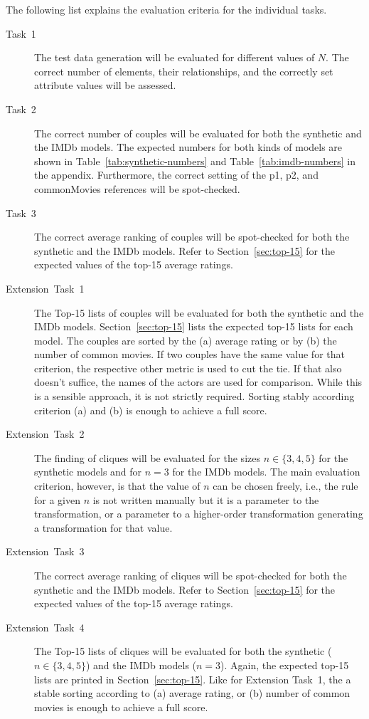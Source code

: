 \documentclass[a4paper,11pt]{article}
\newcommand{\p}[1]{\textsf{\small #1}}
\begin{document}
The following list explains the evaluation criteria for the individual tasks.

\begin{description}
\item[Task~1] The test data generation will be evaluated for different values
  of \(N\).
  The correct number of elements, their relationships, and the correctly set
  attribute values will be assessed.
\item[Task~2] The correct number of couples will be evaluated for both the
  synthetic and the IMDb models.  The expected numbers for both kinds of models
  are shown in Table~\ref{tab:synthetic-numbers} and
  Table~\ref{tab:imdb-numbers} in the appendix.  Furthermore, the correct
  setting of the \p{p1}, \p{p2}, and \p{commonMovies} references will be
  spot-checked.
\item[Task~3] The correct average ranking of couples will be spot-checked for
  both the synthetic and the IMDb models.  Refer to Section~\ref{sec:top-15}
  for the expected values of the top-15 average ratings.
\item[Extension~Task~1] The Top-15 lists of couples will be evaluated for both
  the synthetic and the IMDb models.  Section~\ref{sec:top-15} lists the
  expected top-15 lists for each model.  The couples are sorted by the (a)
  average rating or by (b) the number of common movies.  If two couples have
  the same value for that criterion, the respective other metric is used to cut
  the tie.  If that also doesn't suffice, the names of the actors are used for
  comparison.  While this is a sensible approach, it is not strictly required.
  Sorting stably according criterion (a) and (b) is enough to achieve a full
  score.
\item[Extension~Task~2] The finding of cliques will be evaluated for the sizes
  \(n \in \{3,4,5\}\) for the synthetic models and for \(n=3\) for the IMDb
  models.  The main evaluation criterion, however, is that the value of \(n\)
  can be chosen freely, i.e., the rule for a given \(n\) is not written
  manually but it is a parameter to the transformation, or a parameter to a
  higher-order transformation generating a transformation for that value.
\item[Extension~Task~3] The correct average ranking of cliques will be
  spot-checked for both the synthetic and the IMDb models.  Refer to
  Section~\ref{sec:top-15} for the expected values of the top-15 average
  ratings.
\item[Extension~Task~4] The Top-15 lists of cliques will be evaluated for both
  the synthetic (\(n \in \{3,4,5\}\)) and the IMDb models (\(n=3\)).  Again,
  the expected top-15 lists are printed in Section~\ref{sec:top-15}.  Like for
  Extension Task~1, the a stable sorting according to (a) average rating, or
  (b) number of common movies is enough to achieve a full score.
\end{description}
\end{document}
